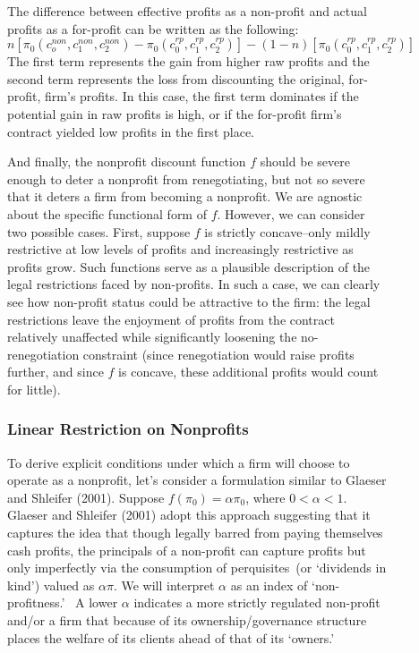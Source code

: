 \documentclass[11pt]{article}%
\begin{document}
\begin{figure}
{The difference between effective profits as a non-profit and actual profits as
a for-profit can be written as the following:
\[
n\left[  \pi_{0}\left(  c_{o}^{non},c_{1}^{non},c_{2}^{non}\right)  -\pi
_{0}\left(  c_{0}^{rp},c_{1}^{rp},c_{2}^{rp}\right)  \right]  -\left(
1-n\right)  \left[  \pi_{0}\left(  c_{0}^{rp},c_{1}^{rp},c_{2}^{rp}\right)
\right]
\]
The first term represents the gain from higher raw profits and the second term
represents the loss from discounting the original, for-profit, firm's profits.
In this case, the first term dominates if the potential gain in raw profits is
high, or if the for-profit firm's contract yielded low profits in the first place.

And finally, the nonprofit discount function $f$ should be severe enough to
deter a nonprofit from renegotiating, but not so severe that it deters a firm
from becoming a nonprofit. We are agnostic about the specific functional form
of $f$. However, we can consider two possible cases. First, suppose $f$ is
strictly concave--only mildly restrictive at low levels of profits and
increasingly restrictive as profits grow. Such functions serve as a plausible
description of the legal restrictions faced by non-profits. In such a case, we
can clearly see how non-profit status could be attractive to the firm: the
legal restrictions leave the enjoyment of profits from the contract relatively
unaffected while significantly loosening the no-renegotiation constraint
(since renegotiation would raise profits further, and since $f$ is concave,
these additional profits would count for little).

\subsubsection{Linear Restriction on Nonprofits}

To derive explicit conditions under which a firm will choose to operate as a
nonprofit, let's consider a formulation similar to Glaeser and Shleifer
(2001). Suppose $f\left(  \pi_{0}\right)  =\alpha\pi_{0}$, where $0<\alpha<1$.
Glaeser and Shleifer (2001) adopt this approach suggesting that it captures
the idea that though legally barred from paying themselves cash profits, the
principals of a non-profit can capture profits but only imperfectly via the
consumption of perquisites\ (or `dividends in kind') valued as $\alpha\pi.$ We
will interpret $\alpha$ as an index of `non-profitness.' \ A lower $\alpha$
indicates a more strictly regulated non-profit and/or a firm that because of
its ownership/governance structure places the welfare of its clients ahead of
that of its `owners.'

}
\end{figure}
\end{document}
